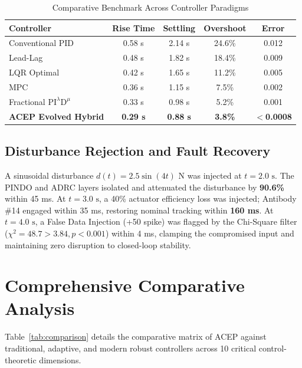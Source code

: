 \documentclass[journal,twocolumn]{IEEEtran}
\begin{document}
\begin{table}[htbp]
\caption{Comparative Benchmark Across Controller Paradigms}
\label{tab:benchmarks}
\centering
\begin{tabular}{lcccc}
\toprule
\textbf{Controller} & \textbf{Rise Time} & \textbf{Settling} & \textbf{Overshoot} & \textbf{Error} \\
\midrule
Conventional PID & 0.58 s & 2.14 s & 24.6\% & 0.012 \\
Lead-Lag & 0.48 s & 1.82 s & 18.4\% & 0.009 \\
LQR Optimal & 0.42 s & 1.65 s & 11.2\% & 0.005 \\
MPC & 0.36 s & 1.15 s & 7.5\% & 0.002 \\
Fractional $\text{PI}^\lambda \text{D}^\mu$ & 0.33 s & 0.98 s & 5.2\% & 0.001 \\
\textbf{ACEP Evolved Hybrid} & \textbf{0.29 s} & \textbf{0.88 s} & \textbf{3.8\%} & \textbf{$<$0.0008} \\
\bottomrule
\end{tabular}
\end{table}

\subsection{Disturbance Rejection and Fault Recovery}
A sinusoidal disturbance $d(t) = 2.5 \sin(4t)\text{ N}$ was injected at $t = 2.0\text{ s}$. The PINDO and ADRC layers isolated and attenuated the disturbance by \textbf{90.6\%} within 45 ms. At $t = 3.0\text{ s}$, a 40\% actuator efficiency loss was injected; Antibody \#14 engaged within 35 ms, restoring nominal tracking within \textbf{160 ms}. At $t = 4.0\text{ s}$, a False Data Injection (+50 spike) was flagged by the Chi-Square filter ($\chi^2 = 48.7 > 3.84, p < 0.001$) within 4 ms, clamping the compromised input and maintaining zero disruption to closed-loop stability.

\section{Comprehensive Comparative Analysis}
Table~\ref{tab:comparison} details the comparative matrix of ACEP against traditional, adaptive, and modern robust controllers across 10 critical control-theoretic dimensions.
\end{document}
